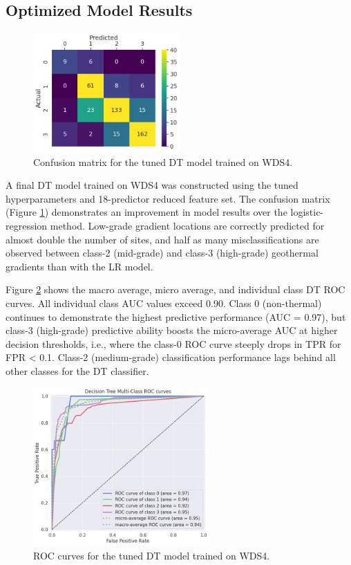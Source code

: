 \subsection{Optimized Model Results}\label{dtree_final_results}

\begin{figure}
\centering
\includegraphics[width=0.5\textwidth]{templates/images/Figure-DT-ConfusionMatrix.png}
\singlespacing
\caption[Decision tree confusion matrix]{Confusion matrix for the tuned DT model trained on WDS4.}
\label{fig:dtree_conf_matrix}
\end{figure}

A final DT model trained on WDS4 was constructed using the tuned hyperparameters and 18-predictor reduced feature set. The confusion matrix (Figure \ref{fig:dtree_conf_matrix}) demonstrates an improvement in model results over the logistic-regression method. Low-grade gradient locations are correctly predicted for almost double the number of sites, and half as many misclassifications are observed between class-2 (mid-grade) and class-3 (high-grade) geothermal gradients than with the LR model.

Figure \ref{fig:dtree_auc} shows the macro average, micro average, and individual class DT ROC curves. All individual class AUC values exceed 0.90. Class 0 (non-thermal) continues to demonstrate the highest predictive performance (AUC = 0.97), but class-3 (high-grade) predictive ability boosts the micro-average AUC at higher decision thresholds, i.e., where the class-0 ROC curve steeply drops in TPR for FPR < 0.1. Class-2 (medium-grade) classification performance lags behind all other classes for the DT classifier.

\begin{figure}
\centering
\includegraphics[width=0.6\textwidth]{templates/images/Figure-DT_AUC.png}
\caption[Decision tree ROC curves]{ROC curves for the tuned DT model trained on WDS4.}
\label{fig:dtree_auc}
\end{figure}

